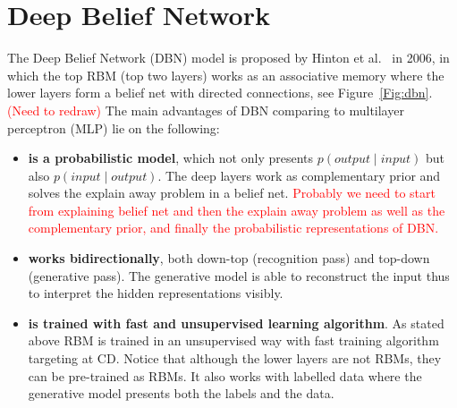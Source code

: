 \documentclass[11pt,twoside,a4paper]{article}
\begin{document}
\section{Deep Belief Network}
The Deep Belief Network (DBN) model is proposed by Hinton et al.~\cite{hinton2006fast} in 2006, in which the top RBM (top two layers) works as an associative memory where the lower layers form a belief net with directed connections, see Figure~\ref{Fig:dbn}. \textcolor{red}{(Need to redraw)}
The main advantages of DBN comparing to multilayer perceptron (MLP) lie on the following:
	\begin{itemize}
	  \item \textbf{is a probabilistic model}, which not only presents $p(output \mid input)$ but also $p(input \mid output)$.
	  The deep layers work as complementary prior and solves the explain away problem in a belief net.
	  \textcolor{red}{Probably we need to start from explaining belief net and then the explain away problem as well as the complementary prior, and finally the probabilistic representations of DBN. }  
	  \item \textbf{works bidirectionally}, both down-top (recognition pass) and top-down (generative pass).
	  The generative model is able to reconstruct the input thus to interpret the hidden representations visibly.
	  \item \textbf{is trained with fast and unsupervised learning algorithm}.
	  As stated above RBM is trained in an unsupervised way with fast training algorithm targeting at CD.
	  Notice that although the lower layers are not RBMs, they can be pre-trained as RBMs.
	  It also works with labelled data where the generative model presents both the labels and the data. 
	\end{itemize}
\end{document}
